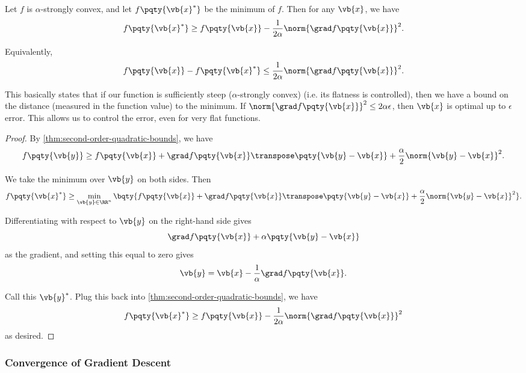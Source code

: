 \begin{corollary}
    \label{cor:grad-descent-alpha-bound}%
    Let \(f\) is \(\alpha\)-strongly convex, and let \(f\pqty{\vb{x}^{\ast}}\) be the minimum of \(f\). Then for any \(\vb{x}\), we have
    \[
        f\pqty{\vb{x}^{\ast}} \geq f\pqty{\vb{x}} - \frac{1}{2 \alpha} \norm{\grad f\pqty{\vb{x}}}^2.
    \]

    Equivalently,
    \[
        f\pqty{\vb{x}} - f\pqty{\vb{x}^{\ast}} \leq \frac{1}{2 \alpha} \norm{\grad f\pqty{\vb{x}}}^2.
    \]
\end{corollary}

This basically states that if our function is sufficiently steep (\(\alpha\)-strongly convex) (i.e. its flatness is controlled), then we have a bound on the distance (measured in the function value) to the minimum. If \(\norm{\grad f\pqty{\vb{x}}}^2 \leq 2 \alpha \epsilon\), then \(\vb{x}\) is optimal up to \(\epsilon\) error. This allows us to control the error, even for very flat functions.

\begin{proof}
    By \autoref{thm:second-order-quadratic-bounds}, we have
    \[
        f\pqty{\vb{y}} \geq f\pqty{\vb{x}} + \grad f\pqty{\vb{x}}\transpose \pqty{\vb{y} - \vb{x}} + \frac{\alpha}{2} \norm{\vb{y} - \vb{x}}^2.
    \]

    We take the minimum over \(\vb{y}\) on both sides. Then
    \[
        f\pqty{\vb{x}^{\ast}} \geq \min_{\vb{y} \in \RR^n} \bqty{f\pqty{\vb{x}} + \grad f\pqty{\vb{x}}\transpose \pqty{\vb{y} - \vb{x}} + \frac{\alpha}{2} \norm{\vb{y} - \vb{x}}^2}.
    \]

    Differentiating with respect to \(\vb{y}\) on the right-hand side gives
    \[
        \grad f\pqty{\vb{x}} + \alpha \pqty{\vb{y} - \vb{x}}
    \]
    as the gradient, and setting this equal to zero gives
    \[
        \vb{y} = \vb{x} - \frac{1}{\alpha} \grad f\pqty{\vb{x}}.
    \]

    Call this \(\vb{y}^{\ast}\). Plug this back into \autoref{thm:second-order-quadratic-bounds}, we have
    \[
        f\pqty{\vb{x}^{\ast}} \geq f\pqty{\vb{x}} - \frac{1}{2\alpha} \norm{\grad f\pqty{\vb{x}}}^2
    \]
    as desired.
\end{proof}

\subsubsection{Convergence of Gradient Descent}

